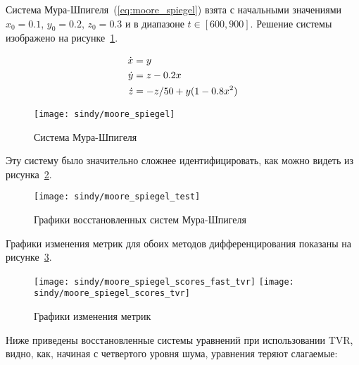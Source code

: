 Система Мура-Шпигеля~(\ref{eq:moore_spiegel}) взята с начальными значениями $x_0 = 0.1$, $y_0 = 0.2$, $z_0 = 0.3$ и в диапазоне $t \in [600, 900]$. Решение системы изображено на рисунке~\ref{fig:moore_spiegel}.

\begin{equation}
\normalspacing
\begin{aligned}
\dot{x} &= y \\
\dot{y} &= z - 0.2 x \\
\dot{z} &= -z / 50 + y (1 - 0.8 x^2)
\end{aligned}
\label{eq:moore_spiegel}
\end{equation}

\begin{figure}
\texttt{[image: sindy/moore\_spiegel]}
\caption{Система Мура-Шпигеля}
\label{fig:moore_spiegel}
\end{figure}

Эту систему было значительно сложнее идентифицировать, как можно видеть из рисунка~\ref{fig:moore_spiegel:test}.

\begin{figure}
\texttt{[image: sindy/moore\_spiegel\_test]}
\caption{Графики восстановленных систем Мура-Шпигеля}
\label{fig:moore_spiegel:test}
\end{figure}

Графики изменения метрик для обоих методов дифференцирования показаны на рисунке~\ref{fig:moore_spiegel:scores}.

\begin{figure}
\texttt{[image: sindy/moore\_spiegel\_scores\_fast\_tvr]}
\texttt{[image: sindy/moore\_spiegel\_scores\_tvr]}
\caption{Графики изменения метрик}
\label{fig:moore_spiegel:scores}
\end{figure}

Ниже приведены восстановленные системы уравнений при использовании TVR, видно, как, начиная с четвертого уровня шума, уравнения теряют слагаемые:


